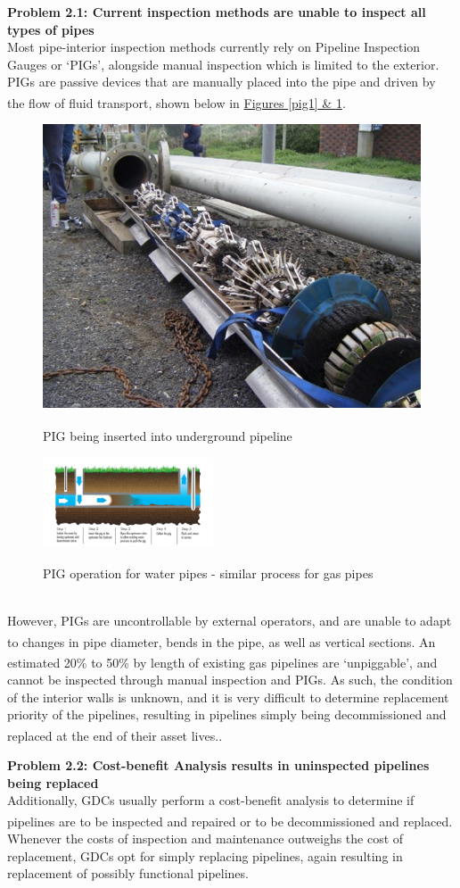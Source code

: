 \documentclass[11pt]{article}		%
\newcommand{\supercite}[1]{\textsuperscript{\cite{#1}}}		%
\begin{document}
	\textbf{Problem 2.1: Current inspection methods are unable to inspect all types of pipes }
	\\Most pipe-interior inspection methods currently rely on Pipeline Inspection Gauges or ‘PIGs’, alongside manual inspection which is limited to the exterior. PIGs are passive devices that are manually placed into the pipe and driven by the flow of fluid transport\supercite{pigging}, shown below in \hyperref[pig1]{Figures \ref*{pig1} \& \ref*{pig2}}.
		\begin{figure}[h]
					\centering
					\begin{multicols}{2}
						\includegraphics[height=0.22\textwidth]{pig1.jpg}
						\caption{PIG being inserted into underground pipeline\supercite{pigimage1}}
						\label{pig1}
						\columnbreak
						\includegraphics[width=0.45\textwidth]{pig2.jpg}
						\caption{PIG operation for water pipes - similar process for gas pipes \supercite{pigimage2}}
						\label{pig2}
					\end{multicols}
				\end{figure}
			\vspace{-0.75cm}
    \\  However, PIGs are uncontrollable by external operators, and are unable to adapt to changes in pipe diameter, bends in the pipe, as well as vertical sections\supercite{piglimitations}. An estimated 20\% to 50\% by length of existing gas pipelines are ‘unpiggable’\supercite{unpiggable}, and cannot be inspected through manual inspection and PIGs. As such, the condition of the interior walls is unknown, and it is very difficult to determine replacement priority of the pipelines, resulting in pipelines simply being decommissioned and replaced at the end of their asset lives.\supercite{decommission}.
    
    \textbf{Problem 2.2: Cost-benefit Analysis results in uninspected pipelines being replaced}\\
    Additionally, GDCs usually perform a cost-benefit analysis to determine if pipelines are to be inspected and repaired or to be decommissioned and replaced\supercite{CBA}. Whenever the costs of inspection and maintenance outweighs the cost of replacement, GDCs opt for simply replacing pipelines, again resulting in replacement of possibly functional pipelines. 
    
\end{document}
